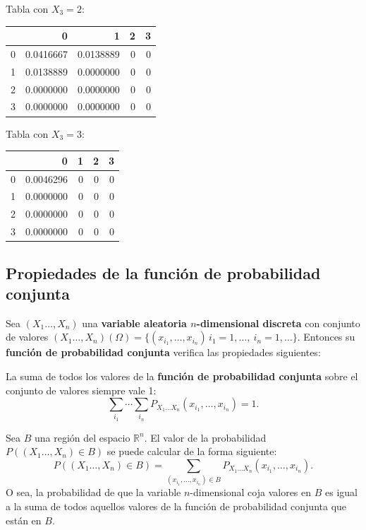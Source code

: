\documentclass[]{book}
\begin{document}
Tabla con \(X_3=2\):

\begin{tabular}{l|r|r|r|r}
\hline
  & 0 & 1 & 2 & 3\\
\hline
0 & 0.0416667 & 0.0138889 & 0 & 0\\
\hline
1 & 0.0138889 & 0.0000000 & 0 & 0\\
\hline
2 & 0.0000000 & 0.0000000 & 0 & 0\\
\hline
3 & 0.0000000 & 0.0000000 & 0 & 0\\
\hline
\end{tabular}

Tabla con \(X_3=3\):

\begin{tabular}{l|r|r|r|r}
\hline
  & 0 & 1 & 2 & 3\\
\hline
0 & 0.0046296 & 0 & 0 & 0\\
\hline
1 & 0.0000000 & 0 & 0 & 0\\
\hline
2 & 0.0000000 & 0 & 0 & 0\\
\hline
3 & 0.0000000 & 0 & 0 & 0\\
\hline
\end{tabular}

\hypertarget{propiedades-de-la-funciuxf3n-de-probabilidad-conjunta-1}{%
\subsection{Propiedades de la función de probabilidad conjunta}\label{propiedades-de-la-funciuxf3n-de-probabilidad-conjunta-1}}

Sea \((X_1\ldots,X_n)\) una \textbf{variable aleatoria \(n\)-dimensional discreta} con conjunto de valores \((X_1\ldots,X_n)(\Omega)=\{(x_{i_1},\ldots,x_{i_n})\, i_1=1,\ldots,\ i_n=1,\ldots\}\). Entonces su \textbf{función de probabilidad conjunta} verifica las propiedades siguientes:

La suma de todos los valores de la \textbf{función de probabilidad conjunta} sobre el conjunto de valores siempre vale 1: \[\sum_{i_1}\cdots\sum_{i_n} P_{X_1\ldots X_n}(x_{i_1},\ldots,x_{i_n})=1.\]

Sea \(B\) una región del espacio \(\mathbb{R}^n\). El valor de la probabilidad \(P((X_1\ldots,X_n)\in B)\) se puede calcular de la forma siguiente:
\[
P((X_1\ldots,X_n)\in B) =\sum_{(x_{i_1},\ldots,x_{i_n})\in B} P_{X_1\ldots X_n}(x_{i_1},\ldots,x_{i_n}).
\]
O sea, la probabilidad de que la variable \(n\)-dimensional coja valores en \(B\) es igual a la suma de todos aquellos valores de la función de probabilidad conjunta que están en \(B\).
\end{document}
